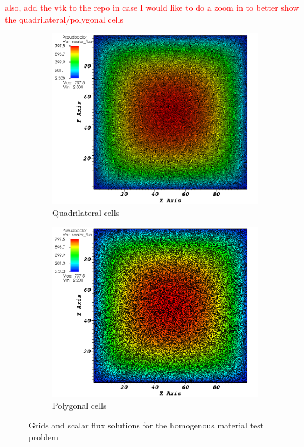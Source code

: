 \textcolor{red}{also, add the vtk to the repo in case I would like to do a zoom in to better show the quadrilateral/polygonal cells}
%
\begin{figure}[!htbp]
  \centering
  \begin{subfigure}{0.75\textwidth}
    \centering
    \includegraphics[width=\textwidth]{big_homog_quad_crop}
    \caption{Quadrilateral cells}
  \end{subfigure}
  \begin{subfigure}{0.75\textwidth}
    \centering
    \includegraphics[width=\textwidth]{big_homog_poly_crop}
    \caption{Polygonal cells}
  \end{subfigure}
  \caption{Grids and scalar flux solutions for the homogenous material test problem}
  \label{homog_test}
\end{figure}
